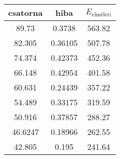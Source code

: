 \begin{center}
\begin{tabular}{|c|c|c|}
\hline
csatorna & hiba & $E_{\text{elméleti}}$ \\
\hline
89.73 & 0.3738 & 563.82 \\
\hline
82.305 & 0.36105 & 507.78 \\
\hline
74.374 & 0.42373 & 452.36 \\
\hline
66.148 & 0.42954 & 401.58 \\
\hline
60.631 & 0.24439 & 357.22 \\
\hline
54.489 & 0.33175 & 319.59 \\
\hline
50.916 & 0.37857 & 288.27 \\
\hline
46.6247 & 0.18966 & 262.55 \\
\hline
42.805 & 0.195 & 241.64 \\
\hline
\end{tabular}
\end{center}